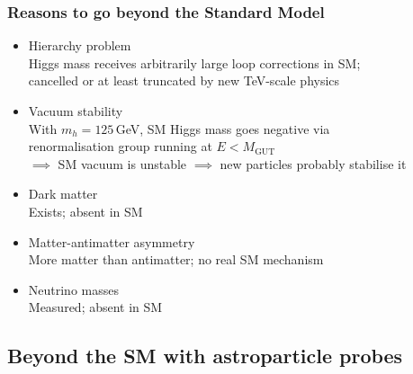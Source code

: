 \documentclass[xcolor=dvipsnames]{beamer}
\newcommand{\cblue}[1]{{\color[rgb]{0.1, 0.0, 0.6} #1}}
\begin{document}
\begin{frame}
\frametitle{Reasons to go beyond the Standard Model}

\begin{itemize}
\item{\cblue{Hierarchy problem} \\\hspace{3mm}\footnotesize Higgs mass receives arbitrarily large loop corrections in SM;\\\hspace{3mm}cancelled or at least truncated by new TeV-scale physics}
\item{\cblue{Vacuum stability} \\\hspace{3mm}\footnotesize With $m_h=125$\,GeV, SM Higgs mass goes negative via\\\hspace{3mm}renormalisation group running at $E<M_\mathrm{GUT}$\\\hspace{3mm}$\implies$ SM vacuum is unstable $\implies$ new particles probably stabilise it}
\item{\cblue{Dark matter} \\\hspace{3mm}\footnotesize Exists; absent in SM}
\item{\cblue{Matter-antimatter asymmetry} \\\hspace{3mm}\footnotesize More matter than antimatter; no real SM mechanism}
\item{\cblue{Neutrino masses} \\\hspace{3mm}\footnotesize Measured; absent in SM}
\end{itemize}

\end{frame}


\subsection{Beyond the SM with astroparticle probes}
\end{document}
